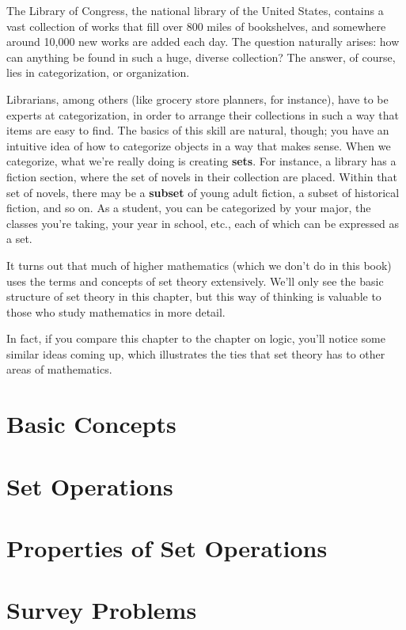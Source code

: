 \documentclass[9pt,letter,twoside,openright]{memoir}
\begin{document}
The Library of Congress, the national library of the United States, contains a vast collection of works that fill over 800 miles of bookshelves, and somewhere around 10,000 new works are added each day.  The question naturally arises: how can anything be found in such a huge, diverse collection?  The answer, of course, lies in categorization, or organization.

Librarians, among others (like grocery store planners, for instance), have to be experts at categorization, in order to arrange their collections in such a way that items are easy to find.  The basics of this skill are natural, though; you have an intuitive idea of how to categorize objects in a way that makes sense.  When we categorize, what we're really doing is creating \textbf{sets}.  For instance, a library has a fiction section, where the set of novels in their collection are placed.  Within that set of novels, there may be a \textbf{subset} of young adult fiction, a subset of historical fiction, and so on.  As a student, you can be categorized by your major, the classes you're taking, your year in school, etc., each of which can be expressed as a set.

It turns out that much of higher mathematics (which we don't do in this book) uses the terms and concepts of set theory extensively.  We'll only see the basic structure of set theory in this chapter, but this way of thinking is valuable to those who study mathematics in more detail.

In fact, if you compare this chapter to the chapter on logic, you'll notice some similar ideas coming up, which illustrates the ties that set theory has to other areas of mathematics.
\vfill
\pagebreak

\section{Basic Concepts}


\section{Set Operations}


\section{Properties of Set Operations}


\section{Survey Problems}

\end{document}

